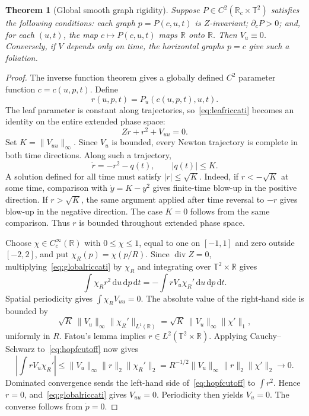 \documentclass[review,12pt,times,a4paper,nopreprintline]{elsarticle}
\theoremstyle{plain}
\newtheorem{theorem}{Theorem}[section]
\theoremstyle{definition}
\theoremstyle{remark}
\newcommand{\T}{\mathbb T}
\newcommand{\R}{\mathbb R}
\newcommand{\dd}{\,\mathrm d}
\newcommand{\diver}{\operatorname{div}}
\numberwithin{equation}{section}
\begin{document}
\begin{theorem}[Global smooth graph rigidity]\label{thm:globalrigidity}
Suppose $P\in C^2(\R_c\times\T^2)$ satisfies the following conditions: each graph $p=P(c,u,t)$ is $Z$-invariant; $\partial_cP>0$; and, for each $(u,t)$, the map $c\mapsto P(c,u,t)$ maps $\R$ onto $\R$. Then $V_u\equiv0$. Conversely, if $V$ depends only on time, the horizontal graphs $p=c$ give such a foliation.
\end{theorem}
\begin{proof}
The inverse function theorem gives a globally defined $C^2$ parameter function $c=c(u,p,t)$. Define
\[
 r(u,p,t)=P_u(c(u,p,t),u,t).
\]
The leaf parameter is constant along trajectories, so~\eqref{eq:leafriccati} becomes an identity on the entire extended phase space:
\begin{equation}\label{eq:globalriccati}
 Zr+r^2+V_{uu}=0.
\end{equation}
Set $K=\|V_{uu}\|_\infty$. Since $V_u$ is bounded, every Newton trajectory is complete in both time directions. Along such a trajectory,
\[
 \dot r=-r^2-q(t),\qquad |q(t)|\leq K.
\]
A solution defined for all time must satisfy $|r|\leq\sqrt K$. Indeed, if $r< -\sqrt K$ at some time, comparison with $\dot y=K-y^2$ gives finite-time blow-up in the positive direction. If $r>\sqrt K$, the same argument applied after time reversal to $-r$ gives blow-up in the negative direction. The case $K=0$ follows from the same comparison. Thus $r$ is bounded throughout extended phase space.

Choose $\chi\in C_c^\infty(\R)$ with $0\leq\chi\leq1$, equal to one on $[-1,1]$ and zero outside $[-2,2]$, and put $\chi_R(p)=\chi(p/R)$. Since $\diver Z=0$, multiplying~\eqref{eq:globalriccati} by $\chi_R$ and integrating over $\T^2\times\R$ gives
\begin{equation}\label{eq:hopfcutoff}
 \int\chi_Rr^2\dd u\dd p\dd t
 =-\int rV_u\chi_R'\dd u\dd p\dd t.
\end{equation}
Spatial periodicity gives $\int\chi_RV_{uu}=0$. The absolute value of the right-hand side is bounded by
\[
 \sqrt K\,\|V_u\|_\infty\|\chi_R'\|_{L^1(\R)}
 =\sqrt K\,\|V_u\|_\infty\|\chi'\|_1,
\]
uniformly in $R$. Fatou's lemma implies $r\in L^2(\T^2\times\R)$. Applying Cauchy--Schwarz to~\eqref{eq:hopfcutoff} now gives
\[
 \left|\int rV_u\chi_R'\right|
 \leq \|V_u\|_\infty\|r\|_2\|\chi_R'\|_2
 =R^{-1/2}\|V_u\|_\infty\|r\|_2\|\chi'\|_2
 \longrightarrow0.
\]
Dominated convergence sends the left-hand side of~\eqref{eq:hopfcutoff} to $\int r^2$. Hence $r=0$, and~\eqref{eq:globalriccati} gives $V_{uu}=0$. Periodicity then yields $V_u=0$. The converse follows from $\dot p=0$.
\end{proof}
\end{document}
